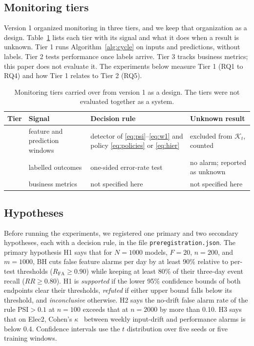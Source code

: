 \documentclass[journal]{IEEEtran}
\begin{document}
\subsection{Monitoring tiers}

Version 1 organized monitoring in three tiers, and we keep that organization as a design. Table~\ref{tab:tiers} lists each tier with its signal and what it does when a result is unknown. Tier 1 runs Algorithm~\ref{alg:cycle} on inputs and predictions, without labels. Tier 2 tests performance once labels arrive. Tier 3 tracks business metrics; this paper does not evaluate it. The experiments below measure Tier 1 (RQ1 to RQ4) and how Tier 1 relates to Tier 2 (RQ5).

\begin{table}[!t]
\caption{Monitoring tiers carried over from version 1 as a design. The tiers were not evaluated together as a system.}
\label{tab:tiers}
\centering
\footnotesize
\setlength{\tabcolsep}{3pt}
\begin{tabular}{>{\raggedright\arraybackslash}p{0.5cm}>{\raggedright\arraybackslash}p{2.1cm}>{\raggedright\arraybackslash}p{2.5cm}>{\raggedright\arraybackslash}p{2.2cm}}
\toprule
Tier & Signal & Decision rule & Unknown result \\
\midrule
1 & feature and prediction windows & detector of \eqref{eq:psi}--\eqref{eq:w1} and policy \eqref{eq:policies} or \eqref{eq:hier} & excluded from $\mathcal{K}_t$, counted \\
2 & labelled outcomes & one-sided error-rate test & no alarm; reported as unknown \\
3 & business metrics & not specified here & not specified here \\
\bottomrule
\end{tabular}
\end{table}

\subsection{Hypotheses}

Before running the experiments, we registered one primary and two secondary hypotheses, each with a decision rule, in the file \texttt{preregistration.json}. The primary hypothesis H1 says that for $N=1000$ models, $F=20$, $n=200$, and $m=1000$, BH cuts false feature alarms per day by at least 90\% relative to per-test thresholds ($R_{\mathrm{FA}}\ge0.90$) while keeping at least 80\% of their three-day event recall ($RR\ge0.80$). H1 is \emph{supported} if the lower 95\% confidence bounds of both endpoints clear their thresholds, \emph{refuted} if either upper bound falls below its threshold, and \emph{inconclusive} otherwise. H2 says the no-drift false alarm rate of the rule PSI${}>0.1$ at $n=100$ exceeds that at $n=2000$ by more than 0.10. H3 says that on Elec2, Cohen's $\kappa$~\cite{cohen1960} between weekly input-drift and performance alarms is below 0.4. Confidence intervals use the $t$ distribution over five seeds or five training windows.
\end{document}
